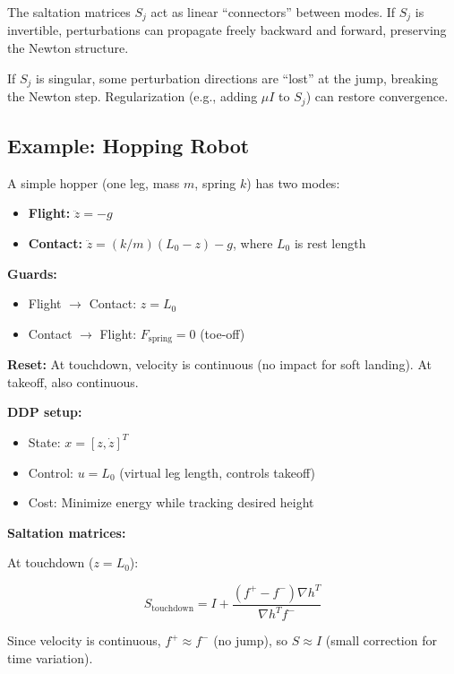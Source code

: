 \documentclass[
  letterpaper,
  DIV=11,
  numbers=noendperiod]{scrartcl}
\providecommand{\tightlist}{%
  \setlength{\itemsep}{0pt}\setlength{\parskip}{0pt}}\usepackage{longtable,booktabs,array}
\begin{document}
The saltation matrices \(S_j\) act as linear ``connectors'' between
modes. If \(S_j\) is invertible, perturbations can propagate freely
backward and forward, preserving the Newton structure.

If \(S_j\) is singular, some perturbation directions are ``lost'' at the
jump, breaking the Newton step. Regularization (e.g., adding \(\mu I\)
to \(S_j\)) can restore convergence.

\subsection{Example: Hopping Robot}\label{example-hopping-robot}

A simple hopper (one leg, mass \(m\), spring \(k\)) has two modes:

\begin{itemize}
\tightlist
\item
  \textbf{Flight:} \(\ddot{z} = -g\)
\item
  \textbf{Contact:} \(\ddot{z} = (k/m)(L_0 - z) - g\), where \(L_0\) is
  rest length
\end{itemize}

\textbf{Guards:}

\begin{itemize}
\tightlist
\item
  Flight \(\to\) Contact: \(z = L_0\)
\item
  Contact \(\to\) Flight: \(F_{\text{spring}} = 0\) (toe-off)
\end{itemize}

\textbf{Reset:} At touchdown, velocity is continuous (no impact for soft
landing). At takeoff, also continuous.

\textbf{DDP setup:}

\begin{itemize}
\tightlist
\item
  State: \(x = [z, \dot{z}]^T\)
\item
  Control: \(u = L_0\) (virtual leg length, controls takeoff)
\item
  Cost: Minimize energy while tracking desired height
\end{itemize}

\textbf{Saltation matrices:}

At touchdown (\(z = L_0\)):

\[
S_{\text{touchdown}} = I + \frac{(f^+ - f^-) \nabla h^T}{\nabla h^T f^-}
\]

Since velocity is continuous, \(f^+ \approx f^-\) (no jump), so
\(S \approx I\) (small correction for time variation).
\end{document}
